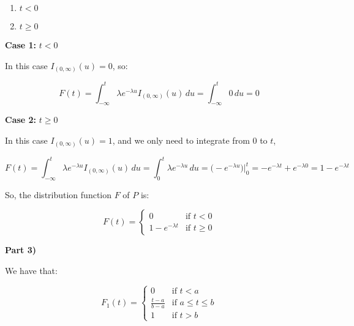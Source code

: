 \begin{enumerate}
    \item $t < 0$
    \item $t \geq 0$
\end{enumerate}

\singlespacing

\textbf{Case 1:} $t < 0$

\singlespacing

In this case $I_{(0,\infty)}(u) = 0$, so:

\singlespacing

\begin{equation}
    F(t) = \int_{-\infty}^{t} \lambda e^{-\lambda u}I_{(0,\infty)}(u) \, du = \int_{-\infty}^{t} 0 \, du = 0
\end{equation}

\singlespacing

\textbf{Case 2:} $t \geq 0$

\singlespacing

In this case $I_{(0,\infty)}(u) = 1$, and we only need to integrate from $0$ to $t$,

\singlespacing

\begin{equation}
    F(t) = \int_{-\infty}^{t} \lambda e^{-\lambda u}I_{(0,\infty)}(u) \, du = \int_{0}^{t} \lambda e^{-\lambda u} \, du = \Big(-e^{-\lambda u} \Big)\Big|_{0}^{t} = -e^{-\lambda t} + e^{-\lambda 0} = 1 - e^{-\lambda t}
\end{equation}

\singlespacing

So, the distribution function $F$ of $P$ is:

\singlespacing

\begin{equation}
    F(t) = \begin{cases}
        0                  & \text{if } t < 0    \\
        1 - e^{-\lambda t} & \text{if } t \geq 0
    \end{cases}
\end{equation}

\singlespacing

\textbf{Part 3)}

\singlespacing

We have that:

\singlespacing

\begin{equation}
    F_1(t) = \begin{cases}
        0                 & \text{if } t < a           \\
        \frac{t - a}{b-a} & \text{if } a \leq t \leq b \\
        1                 & \text{if } t > b
    \end{cases}
\end{equation}

